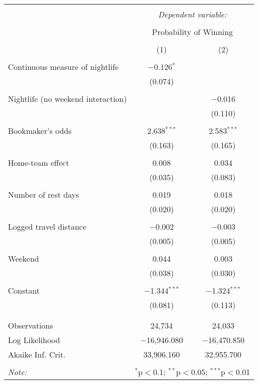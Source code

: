 \documentclass[letterpaper,12pt]{article}
\begin{document}
\begin{tabular}{@{\extracolsep{5pt}}lcc}  \\[-1.8ex]\hline  \hline \\[-1.8ex]   & \multicolumn{2}{c}{\textit{Dependent variable:}} \\  \cline{2-3}  \\[-1.8ex] & \multicolumn{2}{c}{Probability of Winning} \\  \\[-1.8ex] & (1) & (2)\\  \hline \\[-1.8ex]   Continuous measure of nightlife & $-$0.126$^{*}$ &  \\    & (0.074) &  \\    & & \\   Nightlife (no weekend interaction) &  & $-$0.016 \\    &  & (0.110) \\    & & \\   Bookmaker's odds & 2.638$^{***}$ & 2.583$^{***}$ \\    & (0.163) & (0.165) \\    & & \\   Home-team effect & 0.008 & 0.034 \\    & (0.035) & (0.083) \\    & & \\   Number of rest days & 0.019 & 0.018 \\    & (0.020) & (0.020) \\    & & \\   Logged travel distance & $-$0.002 & $-$0.003 \\    & (0.005) & (0.005) \\    & & \\   Weekend & 0.044 & 0.003 \\    & (0.038) & (0.030) \\    & & \\   Constant & $-$1.344$^{***}$ & $-$1.324$^{***}$ \\    & (0.081) & (0.113) \\    & & \\  \hline \\[-1.8ex]  Observations & 24,734 & 24,033 \\  Log Likelihood & $-$16,946.080 & $-$16,470.850 \\  Akaike Inf. Crit. & 33,906.160 & 32,955.700 \\  \hline  \hline \\[-1.8ex]  \textit{Note:}  & \multicolumn{2}{r}{$^{*}$p$<$0.1; $^{**}$p$<$0.05; $^{***}$p$<$0.01} \\  \end{tabular}  
\end{document}
